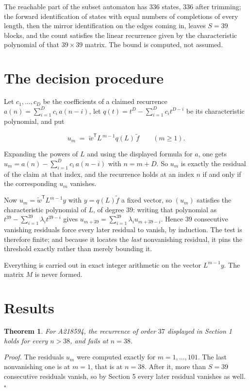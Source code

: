 \documentclass[11pt]{article}
\newtheorem{theorem}{Theorem}
\theoremstyle{definition}
\begin{document}
The reachable part of the subset automaton has $336$ states, $336$ after trimming; the forward identification of states with equal numbers of completions of every length, then the mirror identification on the edges coming in, leaves $S = 39$ blocks, and the count satisfies the linear recurrence given by the characteristic polynomial of that $39\times39$ matrix. The bound is computed, not assumed.

\section{The decision procedure}

Let $c_1,\dots,c_D$ be the coefficients of a claimed recurrence $a(n) = \sum_{i=1}^{D} c_i\,a(n-i)$, let $q(t) = t^{D} - \sum_{i=1}^{D} c_i t^{D-i}$ be its characteristic polynomial, and put

\[u_m \;=\; \tilde w^{\mathsf T} L^{\,m-1} q(L)\,\tilde f \qquad (m \ge 1).\]

Expanding the powers of $L$ and using the displayed formula for $a$, one gets $u_m = a(n) - \sum_{i=1}^{D} c_i\,a(n-i)$ with $n = m + D$. So $u_m$ is exactly the residual of the claim at that index, and the recurrence holds at an index $n$ if and only if the corresponding $u_m$ vanishes.

Now $u_m = \tilde w^{\mathsf T} L^{m-1} y$ with $y = q(L)\tilde f$ a fixed vector, so $(u_m)$ satisfies the characteristic polynomial of $L$, of degree $39$: writing that polynomial as $t^{39} - \sum_{i=1}^{39} \lambda_i t^{39-i}$ gives $u_{m+39} = \sum_{i=1}^{39} \lambda_i u_{m+39-i}$. Hence $39$ consecutive vanishing residuals force every later residual to vanish, by induction. The test is therefore finite; and because it locates the {\itshape last} nonvanishing residual, it pins the threshold exactly rather than merely bounding it.

Everything is carried out in exact integer arithmetic on the vector $L^{m-1}y$. The matrix $M$ is never formed.

\section{Results}

\begin{theorem} For A218594, the recurrence of order $37$ displayed in Section 1 holds for every $n > 38$, and fails at $n = 38$.\end{theorem}

{\itshape Proof.} The residuals $u_m$ were computed exactly for $m = 1,\dots,101$. The last nonvanishing one is at $m = 1$, that is at $n = 38$. After it, more than $S = 39$ consecutive residuals vanish, so by Section 5 every later residual vanishes as well. $\square$
\end{document}
